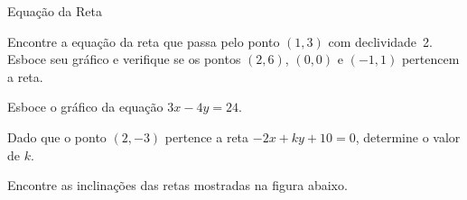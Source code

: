 
\begin{exercicios}{Equação da Reta}
    
    \begin{exercicio}
        Encontre a equação da reta que passa pelo ponto $(1,3)$ com declividade~2. 
        Esboce seu gráfico e verifique se os pontos $(2,6)$, $(0,0)$ e $(-1,1)$ pertencem a reta.
    \end{exercicio}

    \begin{exercicio}
        Esboce o gráfico da equação $3x - 4y = 24$.
    \end{exercicio}

    \begin{exercicio}
        Dado que o ponto $(2,-3)$ pertence a reta $-2x+ky+10=0$, determine o valor de $k$.
    \end{exercicio}
    
    \begin{exercicio}
        Encontre as inclinações das retas mostradas na figura abaixo.
    \end{exercicio}
        

\end{exercicios}
